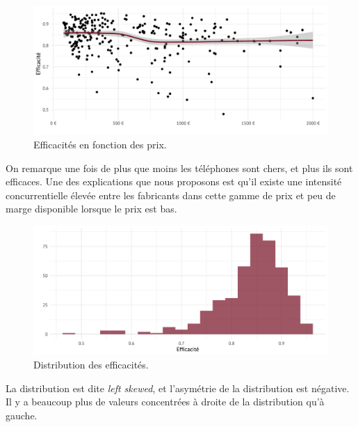 \documentclass[
  12pt,
]{report}
\begin{document}
\begin{figure}[H]

{\centering \includegraphics{report_files/figure-pdf/unnamed-chunk-10-1.pdf}

}

\caption{Efficacités en fonction des prix.}

\end{figure}%

On remarque une fois de plus que moins les téléphones sont chers, et
plus ils sont efficaces. Une des explications que nous proposons est
qu'il existe une intensité concurrentielle élevée entre les fabricants
dans cette gamme de prix et peu de marge disponible lorsque le prix est
bas.

\begin{figure}[H]

{\centering \includegraphics{report_files/figure-pdf/unnamed-chunk-11-1.pdf}

}

\caption{Distribution des efficacités.}

\end{figure}%

La distribution est dite \emph{left skewed}, et l'asymétrie de la
distribution est négative. Il y a beaucoup plus de valeurs concentrées à
droite de la distribution qu'à gauche.

\newpage
\end{document}
